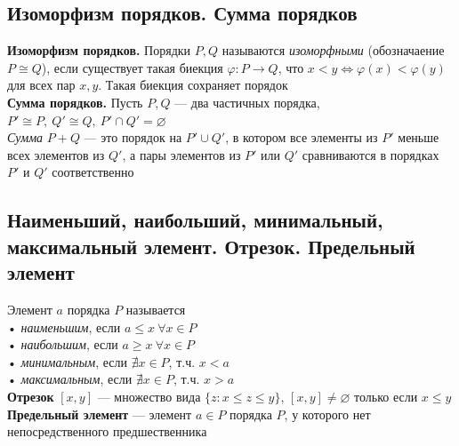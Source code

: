 \documentclass[a4paper]{article}
\begin{document}
\subsection{Изоморфизм порядков. Сумма порядков}
\textbf{Изоморфизм порядков.} Порядки $P,Q$ называются \textit{изоморфными} (обозначаение $P\cong Q$), если существует такая биекция $\varphi: P\to Q$, что $x<y\iff\varphi(x)<\varphi(y)$ для всех пар $x,y$. Такая биекция сохраняет порядок\\[3mm]
\indent\textbf{Сумма порядков.} Пусть $P,Q$ — два частичных порядка, $P'\cong P,\ Q'\cong Q,\ P'\cap Q'=\varnothing$\\[1mm]
\indent\textit{Сумма} $P+Q$ — это порядок на $P'\cup Q'$, в котором все элементы из $P'$ меньше всех элементов из $Q'$, а пары элементов из $P'$ или $Q'$ сравниваются в порядках $P'\textrm{ и }Q'$ соответственно

\subsection{Наименьший, наибольший, минимальный, максимальный элемент. Отрезок. Предельный элемент}
Элемент $a$ порядка $P$ называется\\[2mm]
\indent\indent• \textit{наименьшим}, если $a\leqslant x\ \forall x\in P$\\[2mm]
\indent\indent• \textit{наибольшим}, если $a\geqslant x\ \forall x\in P$\\[2mm]
\indent\indent• \textit{минимальным}, если $\nexists x\in P$, т.ч. $x<a$\\[2mm]
\indent\indent• \textit{максимальным}, если $\nexists x\in P$, т.ч. $x>a$\\[2mm]
\indent\textbf{Отрезок} $[x,y]$ — множество вида $\{z:x\leqslant z\leqslant y\}$, $[x,y]\ne\varnothing$ только если $x\leqslant y$\\[2mm]
\indent\textbf{Предельный элемент} — элемент $a\in P$ порядка $P$, у которого нет непосредственного предшественника
\end{document}
